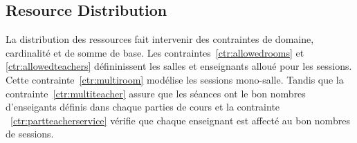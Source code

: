 \subsection{Resource Distribution}
\label{sec:model-distribution}

La distribution des ressources fait intervenir des contraintes de domaine, cardinalité et de somme de base.
Les contraintes~\ref{ctr:allowedrooms} et \ref{ctr:allowedteachers} défininissent les salles et enseignants alloué pour les sessions.
%
Cette contrainte~\ref{ctr:multiroom} modélise les sessions mono-salle.
Tandis que 
la contrainte~\ref{ctr:multiteacher} assure que les séances ont le bon nombres d'enseigants définis dans chaque parties de cours
et la contrainte ~\ref{ctr:partteacherservice} vérifie que chaque enseignant est affecté au bon nombres de sessions.

